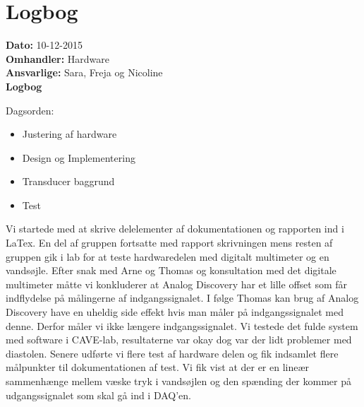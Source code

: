 \section{Logbog}

\textbf{Dato:} 10-12-2015 \\
\textbf{Omhandler:} Hardware \\
\textbf{Ansvarlige:} Sara, Freja og Nicoline \\
\textbf{Logbog}

Dagsorden:
\begin{itemize}
	\item Justering af hardware
	\item Design og Implementering
	\item Transducer baggrund
	\item Test
\end{itemize}

Vi startede med at skrive delelementer af dokumentationen og rapporten ind i LaTex. En del af gruppen fortsatte med rapport skrivningen mens resten af gruppen gik i lab for at teste hardwaredelen med digitalt multimeter og en vandsøjle. Efter snak med Arne og Thomas og konsultation med det digitale multimeter måtte vi konkluderer at Analog Discovery har et lille offset som får indflydelse på målingerne af indgangssignalet. I følge Thomas kan brug af Analog Discovery have en uheldig side effekt hvis man måler på indgangssignalet med denne. Derfor måler vi ikke længere indgangssignalet.
Vi testede det fulde system med software i CAVE-lab, resultaterne var okay dog var der lidt problemer med diastolen. 
Senere udførte vi flere test af hardware delen og fik indsamlet flere målpunkter til dokumentationen af test. Vi fik vist at der er en lineær sammenhænge mellem væske tryk i vandsøjlen og den spænding der kommer på udgangssignalet som skal gå ind i DAQ'en.  